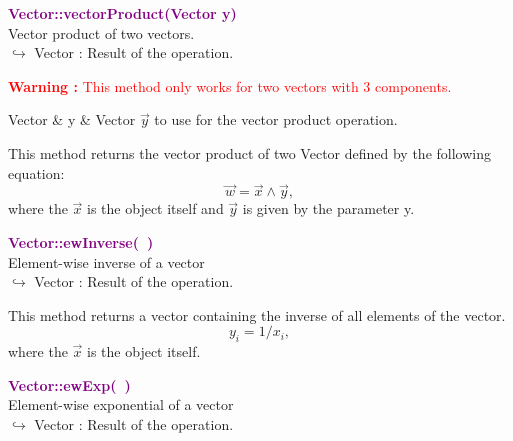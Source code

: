 \textcolor{purple}{\textbf{Vector::vectorProduct(Vector y)}}\label{Vector::vectorProduct(Vector y)}\\
Vector product of two vectors.\\ \hspace*{10mm}$\hookrightarrow$ Vector : Result of the operation.

\hspace*{10mm}\textcolor{red}{\textbf{Warning :} This method only works for two vectors with 3 components.}

\begin{tcolorbox}[width=\textwidth,myArgs,tabularx={ll|R}]
Vector & y & Vector $\overrightarrow{y}$ to use for the vector product operation.
\end{tcolorbox}

This method returns the vector product of two Vector defined by the following equation:
\begin{equation*}
\overrightarrow{w} = \overrightarrow{x}\land\overrightarrow{y},
\end{equation*}
where the $\overrightarrow{x}$ is the object itself and $\overrightarrow{y}$ is given by the parameter y.

\textcolor{purple}{\textbf{Vector::ewInverse(~)}}\label{Vector::ewInverse()}\\
Element-wise inverse of a vector\\ \hspace*{10mm}$\hookrightarrow$ Vector : Result of the operation.

This method returns a vector containing the inverse of all elements of the vector.
\begin{equation*}
y_i = 1/x_i,
\end{equation*}
where the $\overrightarrow{x}$ is the object itself.

\textcolor{purple}{\textbf{Vector::ewExp(~)}}\label{Vector::ewExp()}\\
Element-wise exponential of a vector\\ \hspace*{10mm}$\hookrightarrow$ Vector : Result of the operation.

